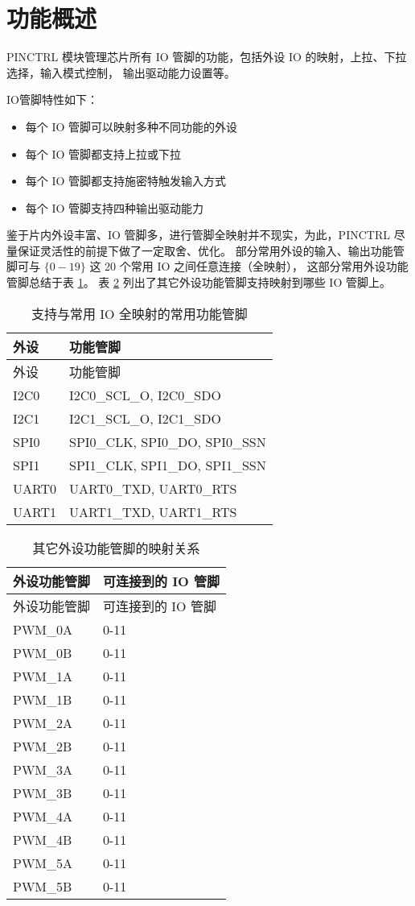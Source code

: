 \documentclass[
  12pt,
]{book}
\providecommand{\tightlist}{%
  \setlength{\itemsep}{0pt}\setlength{\parskip}{0pt}}
\begin{document}
\hypertarget{ux529fux80fdux6982ux8ff0-1}{%
\section{功能概述}\label{ux529fux80fdux6982ux8ff0-1}}

PINCTRL 模块管理芯片所有 IO 管脚的功能，包括外设 IO 的映射，上拉、下拉选择，输入模式控制，
输出驱动能力设置等。

IO管脚特性如下：

\begin{itemize}
\tightlist
\item
  每个 IO 管脚可以映射多种不同功能的外设
\item
  每个 IO 管脚都支持上拉或下拉
\item
  每个 IO 管脚都支持施密特触发输入方式
\item
  每个 IO 管脚支持四种输出驱动能力
\end{itemize}

鉴于片内外设丰富、IO 管脚多，进行管脚全映射并不现实，为此，PINCTRL 尽量保证灵活性的前提下做了一定取舍、优化。
部分常用外设的输入、输出功能管脚可与 \(\{{0-19\}}\) 这 20 个常用 IO 之间任意连接（全映射），
这部分常用外设功能管脚总结于表 \ref{tab:ch-pinctrl-common-set}。
表 \ref{tab:ch-pinctrl-mapping} 列出了其它外设功能管脚支持映射到哪些 IO 管脚上。

\begin{longtable}[]{@{}ll@{}}
\caption{\label{tab:ch-pinctrl-common-set} 支持与常用 IO 全映射的常用功能管脚}\tabularnewline
\toprule
外设 & 功能管脚\tabularnewline
\midrule
\endfirsthead
\toprule
外设 & 功能管脚\tabularnewline
\midrule
\endhead
I2C0 & I2C0\_SCL\_O, I2C0\_SDO\tabularnewline
I2C1 & I2C1\_SCL\_O, I2C1\_SDO\tabularnewline
SPI0 & SPI0\_CLK, SPI0\_DO, SPI0\_SSN\tabularnewline
SPI1 & SPI1\_CLK, SPI1\_DO, SPI1\_SSN\tabularnewline
UART0 & UART0\_TXD, UART0\_RTS\tabularnewline
UART1 & UART1\_TXD, UART1\_RTS\tabularnewline
\bottomrule
\end{longtable}

\begin{longtable}[]{@{}ll@{}}
\caption{\label{tab:ch-pinctrl-mapping} 其它外设功能管脚的映射关系}\tabularnewline
\toprule
外设功能管脚 & 可连接到的 IO 管脚\tabularnewline
\midrule
\endfirsthead
\toprule
外设功能管脚 & 可连接到的 IO 管脚\tabularnewline
\midrule
\endhead
PWM\_0A & 0-11\tabularnewline
PWM\_0B & 0-11\tabularnewline
PWM\_1A & 0-11\tabularnewline
PWM\_1B & 0-11\tabularnewline
PWM\_2A & 0-11\tabularnewline
PWM\_2B & 0-11\tabularnewline
PWM\_3A & 0-11\tabularnewline
PWM\_3B & 0-11\tabularnewline
PWM\_4A & 0-11\tabularnewline
PWM\_4B & 0-11\tabularnewline
PWM\_5A & 0-11\tabularnewline
PWM\_5B & 0-11\tabularnewline
\bottomrule
\end{longtable}
\end{document}
